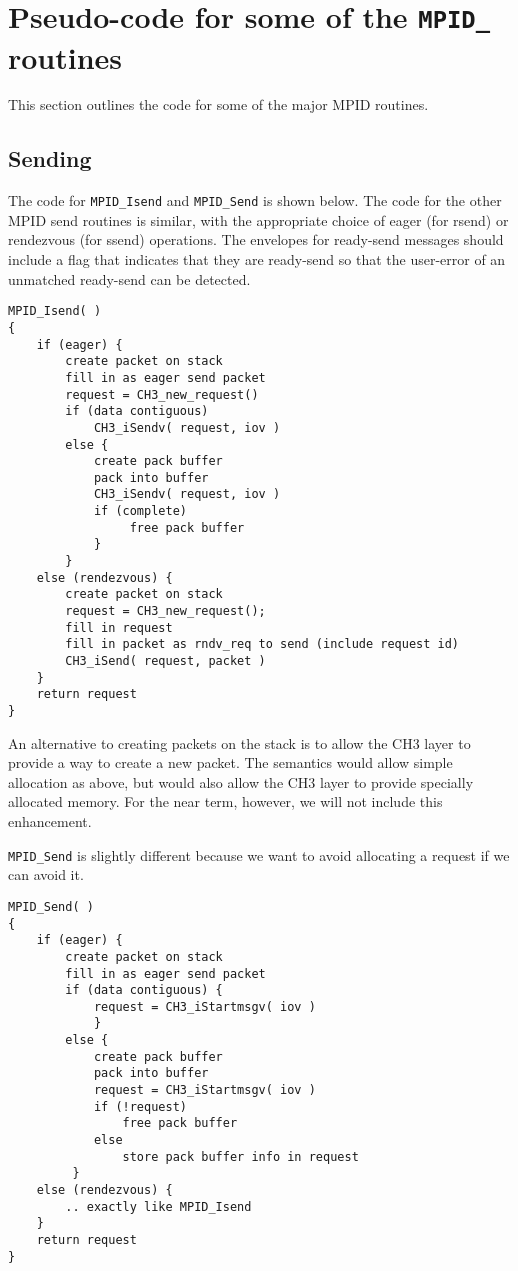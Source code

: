 \documentclass{article}
\def\code{\begingroup\makeustext\eatcode}
\def\eatcode#1{\texttt{#1}\endgroup}
\begin{document}

\section{Pseudo-code for some of the \code{MPID\_} routines}
This section outlines the code for some of the major MPID routines.

\subsection{Sending}
The code for \code{MPID_Isend} and \code{MPID_Send} is shown below.  The code
for the other 
MPID send routines is similar, with the appropriate choice of eager
(for rsend) or rendezvous (for ssend) operations.  
The envelopes for ready-send messages should include
a flag that indicates that they are ready-send so that the user-error of an
unmatched ready-send can be detected.

\begin{verbatim}
MPID_Isend( )
{
    if (eager) {
        create packet on stack
        fill in as eager send packet
        request = CH3_new_request()
        if (data contiguous)
            CH3_iSendv( request, iov )
        else {
            create pack buffer
            pack into buffer
            CH3_iSendv( request, iov )
            if (complete)
                 free pack buffer
            }
        }
    else (rendezvous) {
        create packet on stack
        request = CH3_new_request();
        fill in request
        fill in packet as rndv_req to send (include request id)
        CH3_iSend( request, packet )
    } 
    return request
}
\end{verbatim}

An alternative to creating packets on the stack is to allow the CH3 layer to
provide a way to create a new packet. The semantics would allow simple
allocation as above, but would also allow the CH3 layer to provide specially
allocated memory.  For the near term, however, we will not include this
enhancement. 

\code{MPID_Send} is slightly different because we want to avoid allocating a
request if we can avoid it.  

\begin{verbatim}
MPID_Send( )
{
    if (eager) {
        create packet on stack
        fill in as eager send packet
        if (data contiguous) {
            request = CH3_iStartmsgv( iov )
            }
        else {
            create pack buffer
            pack into buffer
            request = CH3_iStartmsgv( iov )
            if (!request)
                free pack buffer
            else
                store pack buffer info in request
         }
    else (rendezvous) {
        .. exactly like MPID_Isend
    } 
    return request
}
\end{verbatim}
\end{document}

